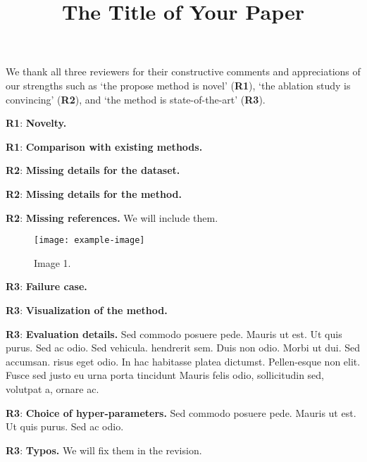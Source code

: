 \documentclass[10pt,twocolumn,letterpaper]{article}
\newcommand{\Rone}{\vspace{0.0em}\noindent \textcolor[RGB]{0, 123, 167}{\textbf{R1}\hspace{0.0em}}}
\newcommand{\Rtwo}{\vspace{0.0em}\noindent \textcolor[RGB]{204, 85, 0}{\textbf{R2}\hspace{0.0em}}}
\newcommand{\Rthree}{\vspace{0.0em}\noindent \textcolor[RGB]{0, 128, 0}{\textbf{R3}\hspace{0.0em}}}
\begin{document}
\title{The Title of Your Paper}

\maketitle

\thispagestyle{empty}
\appendix

We thank all three reviewers for their constructive comments and appreciations of our strengths such as `the propose method is novel' (\Rone), `the ablation study is convincing' (\Rtwo), and `the method is state-of-the-art' (\Rthree).


\begin{table}[t]
\centering
\caption{Table 1.}
\label{tab:table}
    \vspace{-1em}
\end{table}

\Rone: \textbf{Novelty.}
\lipsum[1]

\Rone: \textbf{Comparison with existing methods.}
\lipsum[2]

\Rtwo: \textbf{Missing details for the dataset.}
\lipsum[3]

\Rtwo: \textbf{Missing details for the method.}
\lipsum[4]

\Rtwo: \textbf{Missing references.}
We will include them. 

\begin{figure}[tb] \centering
    \texttt{[image: example-image]}
    \caption{Image 1.} \label{fig:img1}
    \vspace{-1em}
\end{figure}

\Rthree: \textbf{Failure case.}
\lipsum[5]

\Rthree: \textbf{Visualization of the method.}
\lipsum[6]

\Rthree: \textbf{Evaluation details.}
Sed commodo posuere pede. Mauris ut est. Ut quis purus. Sed ac odio. Sed vehicula. hendrerit sem. Duis non odio. Morbi ut dui. Sed accumsan. risus eget odio. In hac habitasse platea dictumst. Pellen-esque non elit. Fusce sed justo eu urna porta tincidunt Mauris felis odio, sollicitudin sed, volutpat a, ornare ac.

\Rthree: \textbf{Choice of hyper-parameters.}
Sed commodo posuere pede. Mauris ut est. Ut quis purus. Sed ac odio. 


\Rthree: \textbf{Typos.}
We will fix them in the revision.
\end{document}
